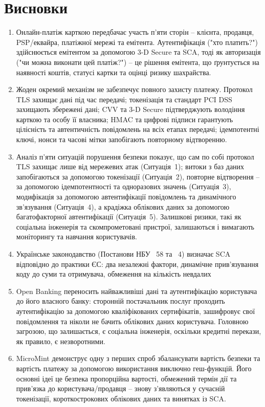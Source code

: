 \section{Висновки}
\label{sec:conclusions}

\begin{enumerate}
    \item Онлайн-платіж карткою передбачає участь п'яти сторін -- клієнта, продавця, PSP/еквайра, платіжної 
        мережі та емітента. Аутентифікація ("хто платить?"{}) здійснюється емітентом за допомогою 3-D Secure та 
        SCA, тоді як авторизація ("чи можна виконати цей платіж?"{}) -- це рішення емітента, що ґрунтується на 
        наявності коштів, статусі картки та оцінці ризику шахрайства.
    \item Жоден окремий механізм не забезпечує повного захисту платежу. Протокол TLS захищає дані під час 
        передачі; токенізація та стандарт PCI DSS захищають збережені дані; CVV та 3-D Secure підтверджують 
        володіння карткою та особу її власника; HMAC та цифрові підписи гарантують цілісність та автентичність 
        повідомлень на всіх етапах передачі; ідемпотентні ключі, нонси та часові мітки запобігають повторному 
        відтворенню.
    \item Аналіз п'яти ситуацій порушення безпеки показує, що сам по собі протокол TLS захищає лише від мережевих 
        атак (Ситуація~1); витоки з баз даних запобігаються за допомогою токенізації (Ситуація~2), повторне 
        відтворення -- за допомогою ідемпотентності та одноразових значень (Ситуація~3), модифікація за допомогою 
        автентифікації повідомлень та динамічного зв'язування (Ситуація~4), а крадіжка облікових даних за допомогою 
        багатофакторної автентифікації (Ситуація~5). Залишкові ризики, такі як соціальна інженерія та скомпрометовані 
        пристрої, залишаються і вимагають моніторингу та навчання користувачів.
    \item Українське законодавство (Постанови НБУ \No~58 та \No~4) визначає SCA відповідно до практики ЄС: два 
        незалежні фактори, динамічне прив'язування коду до суми та отримувача, обмеження на кількість невдалих 
    \item Open Banking переносить найважливіші дані та аутентифікацію користувача до його власного банку: 
        сторонній постачальник послуг проходить аутентифікацію за допомогою кваліфікованих сертифікатів, 
        зашифровує свої повідомлення та ніколи не бачить облікових даних користувача. Головною загрозою, що 
        залишається, є соціальна інженерія, оскільки кредитні перекази, як правило, є незворотними.
    \item MicroMint демонструє одну з перших спроб збалансувати вартість безпеки та вартість платежу за 
        допомогою використання виключно геш-функцій. Його основні ідеї це безпека пропорційна вартості, обмежений 
        термін дії та прив'язка до користувача/продавця -- знову з'являються у сучасній токенізації, короткострокових 
        облікових даних та винятках із SCA.
\end{enumerate}